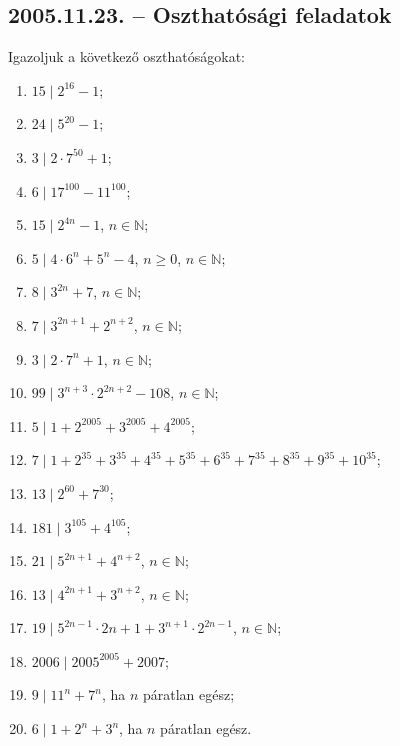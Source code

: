 \documentclass{article}
\begin{document}
\subsection*{2005.11.23. -- Oszthatósági feladatok}
Igazoljuk a következő oszthatóságokat:

\begin{enumerate}
 
\item $15 \mid 2^{16}-1$;

\item $24 \mid 5^{20}-1$;

\item $3 \mid 2 \cdot 7^{50}+1$;

\item $6 \mid 17^{100}-11^{100}$;

\item $15 \mid 2^{4n}-1$, $n \in \mathbb{N}$;

\item $5 \mid 4 \cdot 6^n+5^n-4$, $n \ge 0$, $n \in \mathbb{N}$;

\item $8 \mid 3^{2n}+7$, $n \in \mathbb{N}$;

\item $7 \mid 3^{2n+1}+2^{n+2}$, $n \in \mathbb{N}$;

\item $3 \mid 2 \cdot 7^n+1$, $n \in \mathbb{N}$;

\item $99 \mid 3^{n+3} \cdot 2^{2n+2}-108$, $n \in \mathbb{N}$;

\item $5 \mid 1+2^{2005}+3^{2005}+4^{2005}$;

\item $7 \mid 1+2^{35}+3^{35}+4^{35}+5^{35}+6^{35}+7^{35}+8^{35}+9^{35}+10^{35}$;

\item $13 \mid 2^{60}+7^{30}$;

\item $181 \mid 3^{105}+4^{105}$;

\item $21 \mid 5^{2n+1}+4^{n+2}$, $n \in \mathbb{N}$;

\item $13 \mid 4^{2n+1}+3^{n+2}$, $n \in \mathbb{N}$;

\item $19 \mid 5^{2n-1} \cdot 2{n+1}+3^{n+1} \cdot 2^{2n-1}$, $n \in \mathbb{N}$;

\item $2006 \mid 2005^{2005}+2007$;

\item $9 \mid 11^n+7^n$, ha $n$ páratlan egész;

\item $6 \mid 1+2^n+3^n$, ha $n$ páratlan egész.  
\end{enumerate}
\end{document}
